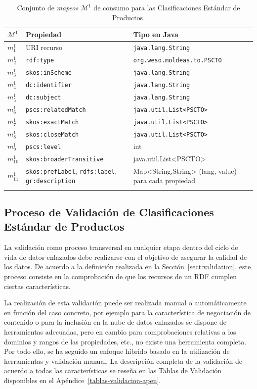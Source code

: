 \begin{longtable}[c]{|p{2cm}|p{6cm}|p{6cm}|} 
\hline
  \textbf{$\mathcal{M}^1$} &  \textbf{Propiedad} & \textbf{Tipo en Java} \\\hline
\endhead
 $m^1_1$ & URI recurso     		& \texttt{java.lang.String} \\ \hline
 $m^1_2$ & \texttt{rdf:type}      	& \texttt{org.weso.moldeas.to.PSCTO} \\ \hline
 $m^1_3$ & \texttt{skos:inScheme} 	& \texttt{java.lang.String}  \\ \hline
 $m^1_4$ & \texttt{dc:identifier} 	& \texttt{java.lang.String} \\ \hline
 $m^1_5$ & \texttt{dc:subject}    	& \texttt{java.lang.String} \\ \hline
 $m^1_6$ & \texttt{pscs:relatedMatch} 	& \texttt{java.util.List<PSCTO> } \\ \hline
 $m^1_7$ & \texttt{skos:exactMatch } 	& \texttt{java.util.List<PSCTO> }\\ \hline
 $m^1_8$ & \texttt{skos:closeMatch } 	& \texttt{java.util.List<PSCTO>}  \\ \hline
 $m^1_9$ & \texttt{pscs:level} 	& int \\ \hline  
 $m^1_{10}$ & \texttt{skos:broaderTransitive} & java.util.List<PSCTO>  \\ \hline
 $m^1_{11}$ & \texttt{skos:prefLabel}, \texttt{rdfs:label}, \texttt{gr:description}  & Map<String,String> (lang, value) para cada propiedad \\ \hline   

\hline
\caption{Conjunto de \textit{mapeos} $\mathcal{M}^1$ de consumo para las Clasificaciones Estándar de Productos.}\label{table:pscs-consumo}\\    
\end{longtable}

\subsection{Proceso de Validación de Clasificaciones Estándar de Productos}
La validación como proceso transversal en cualquier etapa dentro del ciclo de vida de datos 
enlazados debe realizarse con el objetivo de asegurar la calidad de los datos. De acuerdo a la 
definición realizada en la Sección~\ref{sect:validation}, este proceso consiste en la comprobación 
de que los recursos de un \dataset RDF cumplen ciertas características. 

La realización de esta validación puede ser realizada manual o automáticamente en función del caso concreto, por ejemplo para la característica 
de negociación de contenido o para la inclusión en la nube de datos enlazados se dispone de herramientas adecuadas, pero 
en cambio para comprobaciones relativas a los dominios y rangos de las propiedades, etc., no existe una 
herramienta completa. Por todo ello, se ha seguido un enfoque híbrido basado en la utilización de herramientas 
y validación manual. La descripción completa de la validación de acuerdo a todas las características 
se reseña en las Tablas de Validación disponibles en el Apéndice~\ref{tablas-validacion-apen}.

